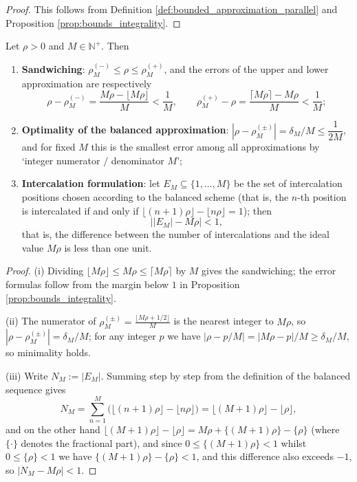 \begin{proof}
This follows from Definition \ref{def:bounded_approximation_parallel} and Proposition \ref{prop:bounds_integrality}.
\end{proof}

\begin{theorem}\label{thm:intercalation_error_bound_parallel}
Let $\rho>0$ and $M\in\mathbb{N}^+$. Then
\begin{enumerate}[label=(\roman*)]
    \item \textbf{Sandwiching}: $\rho^{(-)}_M\le\rho\le\rho^{(+)}_M$, and the errors of the upper and lower approximation are respectively
    \[
    \rho-\rho^{(-)}_M=\frac{M\rho-\lfloor M\rho\rfloor}{M}<\frac1M,
    \qquad
    \rho^{(+)}_M-\rho=\frac{\lceil M\rho\rceil-M\rho}{M}<\frac1M;
    \]
    \item \textbf{Optimality of the balanced approximation}: $|\rho-\rho^{(\pm)}_M|=\delta_M/M\le\dfrac{1}{2M}$, and for fixed $M$ this is the smallest error among all approximations by `integer numerator $/$ denominator $M$';
    \item \textbf{Intercalation formulation}: let $E_M\subseteq\{1,\dots,M\}$ be the set of intercalation positions chosen according to the balanced scheme (that is, the $n$-th position is intercalated if and only if $\lfloor(n+1)\rho\rfloor-\lfloor n\rho\rfloor=1$); then
    \[
    \big||E_M|-M\rho\big|<1,
    \]
    that is, the difference between the number of intercalations and the ideal value $M\rho$ is less than one unit.
\end{enumerate}
\end{theorem}

\begin{proof}
(i) Dividing $\lfloor M\rho\rfloor\le M\rho\le\lceil M\rho\rceil$ by $M$ gives the sandwiching; the error formulas follow from the margin below $1$ in Proposition \ref{prop:bounds_integrality}.

(ii) The numerator of $\rho^{(\pm)}_M=\frac{\lfloor M\rho+1/2\rfloor}{M}$ is the nearest integer to $M\rho$, so $|\rho-\rho^{(\pm)}_M|=\delta_M/M$; for any integer $p$ we have $|\rho-p/M|=|M\rho-p|/M\ge\delta_M/M$, so minimality holds.

(iii) Write $N_M:=|E_M|$. Summing step by step from the definition of the balanced sequence gives
\[
N_M=\sum_{n=1}^{M}\big(\lfloor(n+1)\rho\rfloor-\lfloor n\rho\rfloor\big)=\lfloor(M+1)\rho\rfloor-\lfloor\rho\rfloor,
\]
and on the other hand $\lfloor(M+1)\rho\rfloor-\lfloor\rho\rfloor=M\rho+\{(M+1)\rho\}-\{\rho\}$ (where $\{\cdot\}$ denotes the fractional part), and since $0\le\{(M+1)\rho\}<1$ whilst $0\le\{\rho\}<1$ we have $\{(M+1)\rho\}-\{\rho\}<1$, and this difference also exceeds $-1$, so $|N_M-M\rho|<1$.
\end{proof}

